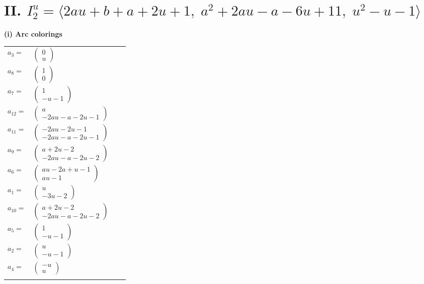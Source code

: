 \documentclass[1p]{elsarticle_modified}
\theoremstyle{definition}
\begin{document}
\centering \section*{II. $I^u_{2}= \langle 2 a u+b+a+2 u+1,\;a^2+2 a u- a-6 u+11,\;u^2- u-1 \rangle$}
\flushleft \textbf{(i) Arc colorings}\\
\begin{tabular}{m{7pt} m{180pt} m{7pt} m{180pt} }
\flushright $a_{3}=$&$\begin{pmatrix}0\\u\end{pmatrix}$ \\
\flushright $a_{8}=$&$\begin{pmatrix}1\\0\end{pmatrix}$ \\
\flushright $a_{7}=$&$\begin{pmatrix}1\\- u-1\end{pmatrix}$ \\
\flushright $a_{12}=$&$\begin{pmatrix}a\\-2 a u- a-2 u-1\end{pmatrix}$ \\
\flushright $a_{11}=$&$\begin{pmatrix}-2 a u-2 u-1\\-2 a u- a-2 u-1\end{pmatrix}$ \\
\flushright $a_{9}=$&$\begin{pmatrix}a+2 u-2\\-2 a u- a-2 u-2\end{pmatrix}$ \\
\flushright $a_{6}=$&$\begin{pmatrix}a u-2 a+u-1\\a u-1\end{pmatrix}$ \\
\flushright $a_{1}=$&$\begin{pmatrix}u\\-3 u-2\end{pmatrix}$ \\
\flushright $a_{10}=$&$\begin{pmatrix}a+2 u-2\\-2 a u- a-2 u-2\end{pmatrix}$ \\
\flushright $a_{5}=$&$\begin{pmatrix}1\\- u-1\end{pmatrix}$ \\
\flushright $a_{2}=$&$\begin{pmatrix}u\\- u-1\end{pmatrix}$ \\
\flushright $a_{4}=$&$\begin{pmatrix}- u\\u\end{pmatrix}$\\&\end{tabular}
\end{document}
